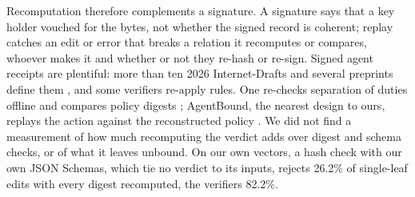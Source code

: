 \documentclass[letterpaper]{article} %
\begin{document}
Recomputation therefore complements a signature. A signature says that a
key holder vouched for the bytes, not whether the signed record is coherent;
replay catches an edit or error that breaks a relation it recomputes or
compares, whoever makes it and whether or not they re-hash or re-sign. Signed agent receipts are
plentiful: more than ten 2026 Internet-Drafts and several
preprints define them
\citep[e.g.,][]{farley2026acta,sahu2026receipts,sharif2026aat,ardebili2026novafabric},
and some verifiers re-apply rules. One re-checks separation of duties
offline and compares policy digests \citep{schrock2026authorization};
AgentBound, the nearest
design to ours, replays the action against the reconstructed policy
\citep{kaul2026agentbound}. We did not find a measurement of how much
recomputing the verdict adds over digest and schema checks, or of what it
leaves unbound. On our own vectors, a hash check with our own JSON Schemas,
which tie no verdict to its inputs, rejects 26.2\% of single-leaf edits
with every digest recomputed, the verifiers 82.2\%.
\end{document}
